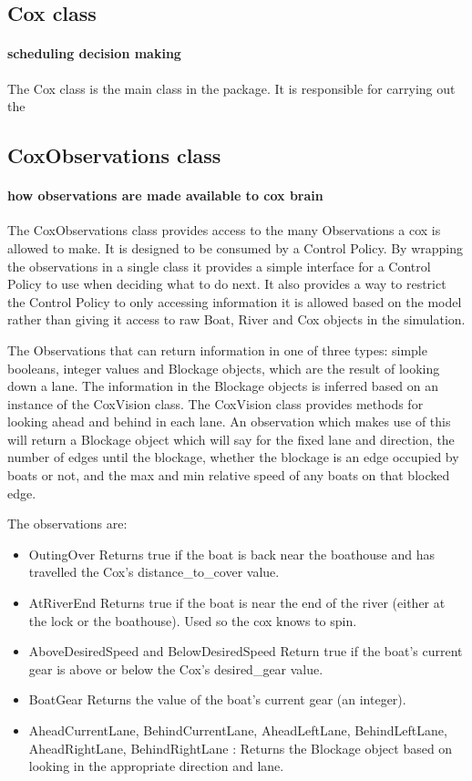 \subsection{Cox class}
\paragraph{scheduling decision making}
The Cox class is the main class in the package. It is responsible for carrying out the 

\subsection{CoxObservations class}
\paragraph{how observations are made available to cox brain}
The CoxObservations class provides access to the many Observations a cox is allowed to make. It is designed to be consumed by a Control Policy. By wrapping the observations in a single class it provides a simple interface for a Control Policy to use when deciding what to do next. It also provides a way to restrict the Control Policy to only accessing information it is allowed based on the model rather than giving it access to raw Boat, River and Cox objects in the simulation.

The Observations that can return information in one of three types: simple booleans, integer values and Blockage objects, which are the result of looking down a lane. The information in the Blockage objects is inferred based on an instance of the CoxVision class. The CoxVision class provides methods for looking ahead and behind in each lane. An observation which makes use of this will return a Blockage object which will say for the fixed lane and direction, the number of edges until the blockage, whether the blockage is an edge occupied by boats or not, and the max and min relative speed of any boats on that blocked edge.

The observations are:
  \begin{itemize}
    \item{OutingOver} Returns true if the boat is back near the boathouse and has travelled the Cox's distance\_to\_cover value.
    \item{AtRiverEnd} Returns true if the boat is near the end of the river (either at the lock or the boathouse). Used so the cox knows to spin.
    \item{AboveDesiredSpeed and BelowDesiredSpeed} Return true if the boat's current gear is above or below the Cox's desired\_gear value. 
    \item{BoatGear} Returns the value of the boat's current gear (an integer).
    \item{AheadCurrentLane, BehindCurrentLane, AheadLeftLane, BehindLeftLane, AheadRightLane, BehindRightLane} : Returns the Blockage object based on looking in the appropriate direction and lane.
  \end{itemize}
  

